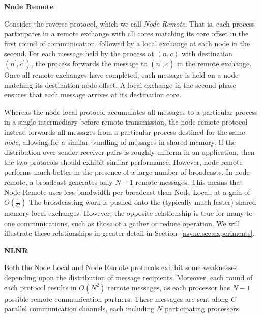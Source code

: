 \documentclass{report}
\begin{document}
\bigskip
\noindent
\textbf{Node Remote}

\noindent
Consider the reverse protocol, which we call \emph{Node Remote}.
That is, each process participates in a remote exchange with all cores matching its core offset in the first round of communication, followed by a local exchange at each node in the second. 
For each message held by the process at $(n, c)$ with destination $(n^\prime, c^\prime)$, the process forwards the message to $(n^\prime, c)$ in the remote exchange.
Once all remote exchanges have completed, each message is held on a node matching its destination node offset. 
A local exchange in the second phase ensures that each message arrives at its destination core. 

Whereas the node local protocol accumulates all messages to a particular process in a single intermediary before remote transmission, the node remote protocol instead forwards all messages from a particular process destined for the same \emph{node}, allowing for a similar bundling of messages in shared memory.
If the distribution over sender-receiver pairs is roughly uniform in an application, then the two protocols should exhibit similar performance.
However, node remote performs much better in the presence of a large number of broadcasts. 
In node remote, a broadcast generates only $N-1$ remote messages.
This means that Node Remote uses less bandwidth per broadcast than Node Local, at a gain of $O \left (\frac{1}{C} \right )$
The broadcasting work is pushed onto the (typically much faster) shared memory local exchanges. 
However, the opposite relationship is true for many-to-one communications, such as those of a gather or reduce operation.
We will illustrate these relationships in greater detail in Section~\ref{async:sec:experiments}.

\bigskip
\noindent
\textbf{NLNR}

\noindent
Both the Node Local and Node Remote protocols exhibit some weaknesses depending upon the distribution of message recipients.
Moreover, each round of each protocol results in $O \left (N^2 \right )$ remote messages, as each processor has $N-1$ possible remote communication partners.
These messages are sent along $C$ parallel communication channels, each including $N$ participating processors.
\end{document}
